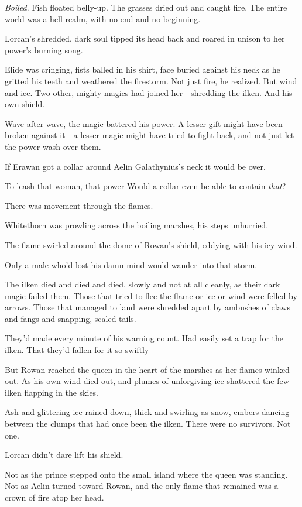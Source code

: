 \emph{Boiled}. Fish floated belly-up. The grasses dried out and caught fire. The entire world was a hell-realm, with no end and no beginning.

Lorcan's shredded, dark soul tipped its head back and roared in unison to her power's burning song.

Elide was cringing, fists balled in his shirt, face buried against his neck as he gritted his teeth and weathered the firestorm. Not just fire, he realized. But wind and ice. Two other, mighty magics had joined her---shredding the ilken. And his own shield.

Wave after wave, the magic battered his power. A lesser gift might have been broken against it---a lesser magic might have tried to fight back, and not just let the power wash over them.

If Erawan got a collar around Aelin Galathynius's neck  it would be over.

To leash that woman, that power  Would a collar even be able to contain \emph{that}?

There was movement through the flames.

Whitethorn was prowling across the boiling marshes, his steps unhurried.

The flame swirled around the dome of Rowan's shield, eddying with his icy wind.

Only a male who'd lost his damn mind would wander into that storm.

The ilken died and died and died, slowly and not at all cleanly, as their dark magic failed them. Those that tried to flee the flame or ice or wind were felled by arrows. Those that managed to land were shredded apart by ambushes of claws and fangs and snapping, scaled tails.

They'd made every minute of his warning count. Had easily set a trap for the ilken. That they'd fallen for it so swiftly---

But Rowan reached the queen in the heart of the marshes as her flames winked out. As his own wind died out, and plumes of unforgiving ice shattered the few ilken flapping in the skies.

Ash and glittering ice rained down, thick and swirling as snow, embers dancing between the clumps that had once been the ilken. There were no survivors. Not one.

Lorcan didn't dare lift his shield.

Not as the prince stepped onto the small island where the queen was standing. Not as Aelin turned toward Rowan, and the only flame that remained was a crown of fire atop her head.

